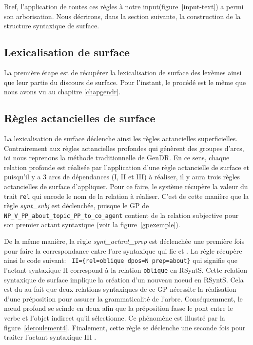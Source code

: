 Bref, l'application de toutes ces règles à notre input(figure~\ref{input-text}) a permi son arborisation. Nous décrirons, dans la section suivante, la construction de la structure syntaxique de surface.

\subsection{Lexicalisation de surface}
La première étape est de récupérer la lexicalisation de surface des lexèmes ainsi que leur partie du discours de surface. Pour l'instant, le procédé est le même que nous avons vu au chapitre \ref{chapgendr}.

\subsection{Règles actancielles de surface}
La lexicalisation de surface déclenche ainsi les règles actancielles superficielles. Contrairement aux règles actancielles profondes qui génèrent des groupes d'arcs, ici nous reprenons la méthode traditionnelle de GenDR. En ce sens, chaque relation profonde est réalisée par l'application d'une règle actancielle de surface et puisqu'il y a 3 arcs de dépendances (I, II et III) à réaliser, il y aura trois règles actancielles de surface d'appliquer. Pour ce faire, le système récupère la valeur du trait \texttt{rel} qui encode le nom de la relation à réaliser. C'est de cette manière que la règle \emph{synt\_subj} est déclenchée, puisque le \ac{GP} de \texttt{NP\_V\_PP\_about\_topic\_PP\_to\_co\_agent} contient de la relation subjective pour son premier actant syntaxique (voir la figure~\ref{gpexemple}).

De la même manière, la règle \emph{synt\_actant\_prep} est déclenchée une première fois pour faire la correspondance entre l'arc syntaxique qui lie  et . La règle récupère ainsi le code suivant: \lstinline! II={rel=oblique dpos=N prep=about}! qui signifie que l'actant syntaxique II correspond à la relation \texttt{oblique} en RSyntS. Cette relation syntaxique de surface implique la création d'un nouveau noeud en \ac{RSyntS}. Cela est du au fait que deux relations syntaxiques de ce \ac{GP} nécessite la réalisation d'une préposition pour assurer la grammaticalité de l'arbre. Conséquemment, le n\oe{}ud profond  se scinde en deux afin que la préposition  fasse le pont entre le verbe et l'objet indirect qu'il sélectionne. Ce phénomène est illustré par la figure~\ref{deroulement4}. Finalement, cette règle se déclenche une seconde fois pour traiter l'actant syntaxique III .

